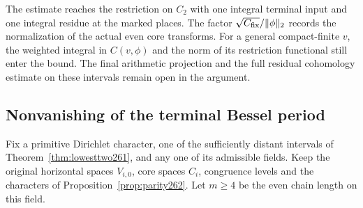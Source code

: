 \documentclass[a4paper,11pt]{article}
\theoremstyle{definition}
\theoremstyle{remark}
\numberwithin{equation}{section}
\begin{document}
The estimate reaches the restriction on \(C_2\) with one
integral terminal input and one integral residue at the marked
places. The factor \(\sqrt{C_{\rm fix}}/\|\phi\|_2\) records
the normalization of the actual even core transforms. For a
general compact-finite \(v\), the weighted integral in
\(C(v,\phi)\) and the norm of its restriction functional still
enter the bound. The final arithmetic projection and the full
residual cohomology estimate on these intervals remain open
in the argument.

\subsection{Nonvanishing of the terminal Bessel period}\label{nav:I-58}
Fix a primitive Dirichlet character, one of the sufficiently
distant intervals of Theorem~\ref{thm:lowesttwo261}, and any
one of its admissible fields. Keep the original horizontal
spaces \(V_{i,0}\), core spaces \(C_i\), congruence levels
and the characters of Proposition~\ref{prop:parity262}.
Let \(m\ge4\) be the even chain length on this field.
\end{document}
